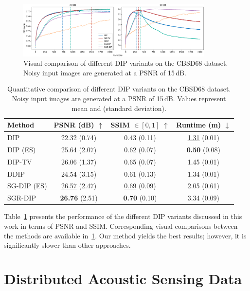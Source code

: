 \begin{figure}
    \centering
    \includegraphics[width=0.875\textwidth]{img/fig_6.1.png}
    \caption{
        Visual comparison of different DIP variants on the CBSD68 dataset.
        Noisy input images are generated at a PSNR of 15\,dB.
    }\label{fig:CBSD68}
\end{figure}

\begin{table}
    \centering
    \begin{tabular}{ l c c c }
        \toprule
        Method &PSNR (dB) $\uparrow$ &SSIM $\in [0,1]$ $\uparrow$ &Runtime (m) $\downarrow$\\
        \midrule
        DIP &22.32 {\scriptsize (0.74)} &0.43 {\scriptsize (0.11)} &\underline{1.31} {\scriptsize (0.01)} \\
        DIP (ES) &25.64 {\scriptsize (2.07)} &0.62 {\scriptsize (0.07)} &\textbf{0.50} {\scriptsize (0.08)} \\
        DIP-TV &26.06 {\scriptsize (1.37)} &0.65 {\scriptsize (0.07)} &1.45 {\scriptsize (0.01)} \\
        DDIP &24.54 {\scriptsize (3.15)} &0.61 {\scriptsize (0.13)} &1.34 {\scriptsize (0.01)} \\
        SG-DIP (ES) &\underline{26.57} {\scriptsize (2.47)} &\underline{0.69} {\scriptsize (0.09)} & 2.05 {\scriptsize (0.61)} \\
        SGR-DIP &\textbf{26.76} {\scriptsize (2.51)} &\textbf{0.70} {\scriptsize (0.10)} & 3.34 {\scriptsize (0.09)} \\
        \bottomrule
    \end{tabular}
    \caption{
        Quantitative comparison of different DIP variants on the CBSD68 dataset.
        Noisy input images are generated at a PSNR of 15\,dB.
        Values represent mean and {\scriptsize (standard deviation)}.
    }\label{tab:CBSD68}
\end{table}

Table~\ref{tab:CBSD68} presents the performance of the different DIP variants discussed in this work in terms of PSNR and SSIM\@.
Corresponding visual comparisons between the methods are available in~\ref{fig:CBSD68}.
Our method yields the best results; however, it is significantly slower than other approaches.


\section{Distributed Acoustic Sensing Data}
